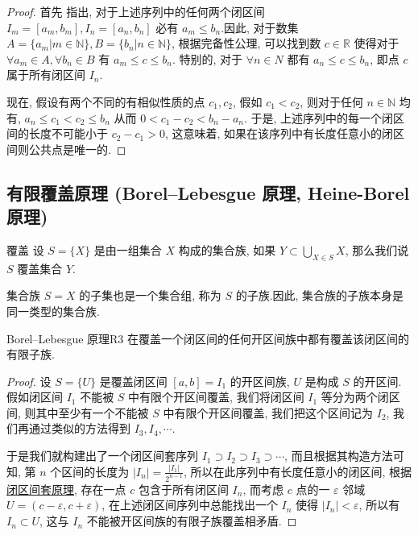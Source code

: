 \documentclass[cn,toc=twocol]{elegantbook}
\newcommand{\R}{\mathbb{R}}
\newcommand{\N}{\mathbb{N}}
\begin{document}
\begin{proof}
首先	指出, 对于上述序列中的任何两个闭区间 $I_m = [a_m, b_m], I_n = [a_n, b_n]$ 必有 $a_m \le b_n$.因此, 对于数集 $A =\{a_m | m\in \N\},  B= \{b_n| n\in \N\}$, 根据完备性公理, 可以找到数 $c\in\R$ 使得对于 $\forall a_m\in A, \forall b_n\in B$ 有 $a_m\le c\le b_n$. 特别的, 对于 $\forall n\in N$ 都有 $a_n\le c \le b_n$, 即点 $c$ 属于所有闭区间 $I_n$.

现在, 假设有两个不同的有相似性质的点 $c_1, c_2$, 假如 $c_1 < c_2$, 则对于任何 $n\in\N$ 均有,  $a_n \le c_1 < c_2 \le b_n$ 从而 $0 < c_1 - c_2 < b_n - a_n$. 于是, 上述序列中的每一个闭区间的长度不可能小于 $c_2 - c_1 > 0$, 这意味着, 如果在该序列中有长度任意小的闭区间则公共点是唯一的. 
\end{proof}
\smallskip

\subsection{有限覆盖原理 (Borel–Lebesgue 原理, Heine-Borel 原理)}

\begin{definition}{覆盖}
设 $S=\{X\}$ 是由一组集合 $X$ 构成的集合族, 如果 $Y\subset \bigcup\limits_{X\in S}X$, 那么我们说 $S$ 覆盖集合 $Y$.
\end{definition}

集合族 $S = {X}$ 的子集也是一个集合组, 称为 $S$ 的子族.因此, 集合族的子族本身是同一类型的集合族.

\begin{theorem}{Borel–Lebesgue 原理}{R3}
在覆盖一个闭区间的任何开区间族中都有覆盖该闭区间的有限子族.
\end{theorem}
\begin{proof}
设 $S =\{U\}$ 是覆盖闭区间 $[a, b] = I_1$ 的开区间族, $U$ 是构成 $S$ 的开区间.假如闭区间 $I_1$ 不能被 $S$ 中有限个开区间覆盖, 我们将闭区间 $I_1$ 等分为两个闭区间, 则其中至少有一个不能被 $S$ 中有限个开区间覆盖, 我们把这个区间记为 $I_2$, 我们再通过类似的方法得到 $I_3, I_4, \cdots$.

于是我们就构建出了一个闭区间套序列 $I_1 \supset I_2 \supset I_3 \supset \cdots$, 而且根据其构造方法可知, 第 $n$ 个区间的长度为 $\lvert I_n \rvert = \frac{\lvert I_1 \rvert}{2^{n-1}}$, 所以在此序列中有长度任意小的闭区间, 根据 \hyperref[thm:R2]{闭区间套原理}, 存在一点 $c$ 包含于所有闭区间 $I_n$, 而考虑 $c$ 点的一 $\varepsilon$ 邻域 $U = (c - \varepsilon,  c+\varepsilon)$, 在上述闭区间序列中总能找出一个 $I_n$ 使得 $\lvert I_n \rvert < \varepsilon$, 所以有 $I_n \subset U$, 这与 $I_n$ 不能被开区间族的有限子族覆盖相矛盾.
\end{proof}
\smallskip
\end{document}
